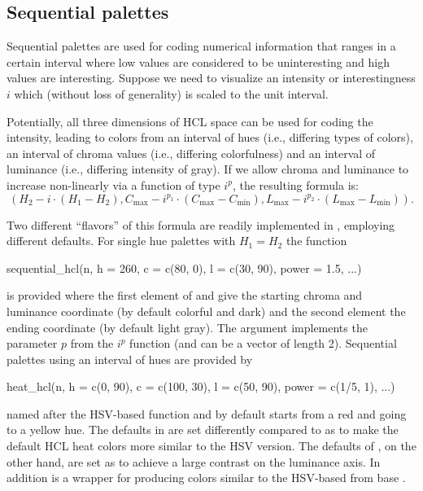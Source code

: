 \documentclass{Z}
\begin{document}
\subsection{Sequential palettes} \label{sec:sequential}

Sequential palettes are used for coding numerical information that ranges
in a certain interval where low values are considered to be uninteresting and
high values are interesting. Suppose we need to visualize an intensity or
interestingness $i$ which (without loss of generality) is scaled to the unit
interval.

Potentially, all three dimensions of HCL space can be used for coding the intensity,
leading to colors from an interval of hues (i.e., differing types of colors),
an interval of chroma values (i.e., differing colorfulness) and an interval of
luminance (i.e., differing intensity of gray). If we allow chroma and luminance
to increase non-linearly via a function of type $i^p$, the resulting formula is:
  \[ (H_2 - i \cdot (H_1 - H_2), C_{\max} - i^{p_1} \cdot (C_{\max} - C_{\min}),
      L_{\max} - i^{p_2} \cdot (L_{\max} - L_{\min})). \]

Two different ``flavors'' of this formula are readily implemented in ,
employing different defaults. For single hue palettes with $H_1 = H_2$ the 
function
\begin{Soutput}
sequential_hcl(n, h = 260, c = c(80, 0), l = c(30, 90), power = 1.5, ...) 
\end{Soutput}
is provided where the first element of  and  give the starting chroma and luminance
coordinate (by default colorful and dark) and the second element the ending coordinate
(by default light gray). The  argument implements the parameter $p$ 
from the $i^p$ function (and can be a vector of length 2). Sequential palettes using an
interval of hues are provided by
\begin{Soutput}
heat_hcl(n, h = c(0, 90), c = c(100, 30), l = c(50, 90), power = c(1/5, 1), ...)
\end{Soutput}
named after the HSV-based  function  and
by default starts from a red and going to a yellow hue. The defaults in 
are set differently compared to  as to make the default HCL heat
colors more similar to the HSV version. The defaults of , on the
other hand, are set as to achieve a large contrast on the luminance axis. In addition
 is a wrapper for  producing colors similar to
the HSV-based  from base .
\end{document}

